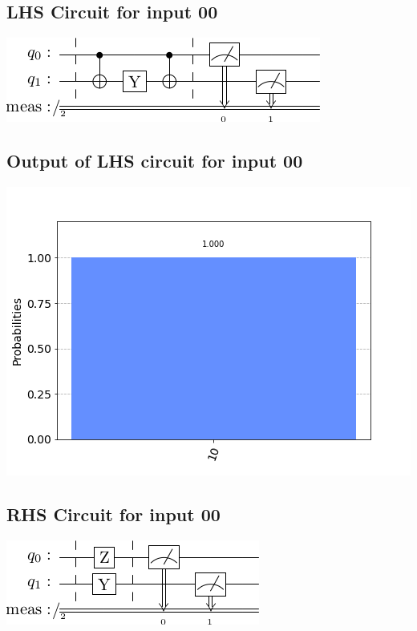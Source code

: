 \documentclass[a4paper]{article}
\begin{document}
    \begin{answer}[Qeusiton 1 b (c)]  
        \subsection*{LHS Circuit for input 00}
        \includegraphics[scale=0.5]{c100.png}
        \subsection*{Output of LHS circuit for input 00}
        \includegraphics[scale = 0.5]{c100-out.png}
        \subsection*{RHS Circuit for input 00}
        \includegraphics[scale=0.5]{c200.png}

\end{answer}
\end{document}
